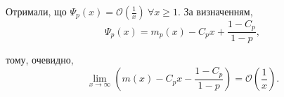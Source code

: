 Отримали, що $\Psi_{p}(x) = \mathcal{O}\left(\frac{1}{x}\right) ~ \forall x \geq 1$. За визначенням, 
\begin{equation*}
\Psi_{p}(x) = m_{p}(x) - C_{p} x + \frac{1 - C_p}{1-p},
\end{equation*}

тому, очевидно, 
\begin{equation}
\label{eq:uniform_right_as_enhanced}
\lim\limits_{x \rightarrow \infty} \left( m(x) - C_{p} x - \frac{1 - C_{p}}{1 - p} \right) = \mathcal{O}\left(\frac{1}{x}\right).
\end{equation}
